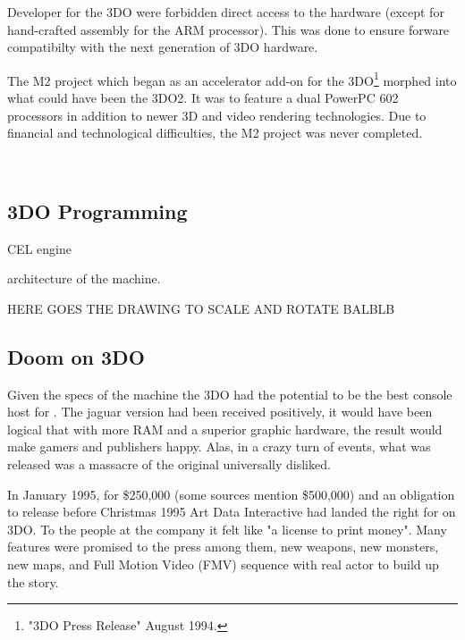 \par
Developer for the 3DO were forbidden direct access to the hardware (except for hand-crafted assembly for the ARM processor). This was done to ensure forware compatibilty with the next generation of 3DO hardware.\\
\par
 The M2 project which began as an accelerator add-on for the 3DO\footnote{"3DO Press Release" August 1994.} morphed into what could have been the 3DO2. It was to feature a dual PowerPC 602 processors in addition to newer 3D and video rendering technologies. Due to financial and technological difficulties, the M2 project was never completed.\\
\par
{}\\
\pagebreak

\subsection{3DO Programming}
CEL engine\\
\par
architecture of the machine.
\pagebreak

HERE GOES THE DRAWING TO SCALE AND ROTATE BALBLB\\
\pagebreak

\subsection{Doom on 3DO}
Given the specs of the machine the 3DO had the potential to be the best console host for \doom. The jaguar version had been received positively, it would have been logical that with more RAM and a superior graphic hardware, the result would make gamers and publishers happy. Alas, in a crazy turn of events, what was released was a massacre of the original universally disliked.\\  
\par
In January 1995, for \$250,000 (some sources mention \$500,000) and an obligation to release before Christmas 1995 Art Data Interactive had landed the right for \doom on 3DO. To the people at the company it felt like "a license to print money". Many features were promised to the press among them, new weapons, new monsters, new maps, and Full Motion Video (FMV) sequence with real actor to build up the story.\\
\par
{}
\par


